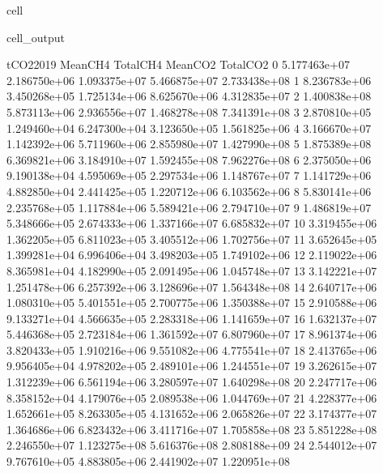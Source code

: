 \documentclass[letterpaper,10pt,english]{jupyterBook}
\begin{document}
\begin{sphinxuseclass}{cell}
\begin{sphinxVerbatimOutput}
\begin{sphinxuseclass}{cell_output}
\begin{sphinxVerbatim}[commandchars=\\\{\}]
       tCO2\PYGZus{}2019      Mean\PYGZus{}CH4     Total\PYGZus{}CH4      Mean\PYGZus{}CO2     Total\PYGZus{}CO2  
0   5.177463e+07  2.186750e+06  1.093375e+07  5.466875e+07  2.733438e+08  
1   8.236783e+06  3.450268e+05  1.725134e+06  8.625670e+06  4.312835e+07  
2   1.400838e+08  5.873113e+06  2.936556e+07  1.468278e+08  7.341391e+08  
3   2.870810e+05  1.249460e+04  6.247300e+04  3.123650e+05  1.561825e+06  
4   3.166670e+07  1.142392e+06  5.711960e+06  2.855980e+07  1.427990e+08  
5   1.875389e+08  6.369821e+06  3.184910e+07  1.592455e+08  7.962276e+08  
6   2.375050e+06  9.190138e+04  4.595069e+05  2.297534e+06  1.148767e+07  
7   1.141729e+06  4.882850e+04  2.441425e+05  1.220712e+06  6.103562e+06  
8   5.830141e+06  2.235768e+05  1.117884e+06  5.589421e+06  2.794710e+07  
9   1.486819e+07  5.348666e+05  2.674333e+06  1.337166e+07  6.685832e+07  
10  3.319455e+06  1.362205e+05  6.811023e+05  3.405512e+06  1.702756e+07  
11  3.652645e+05  1.399281e+04  6.996406e+04  3.498203e+05  1.749102e+06  
12  2.119022e+06  8.365981e+04  4.182990e+05  2.091495e+06  1.045748e+07  
13  3.142221e+07  1.251478e+06  6.257392e+06  3.128696e+07  1.564348e+08  
14  2.640717e+06  1.080310e+05  5.401551e+05  2.700775e+06  1.350388e+07  
15  2.910588e+06  9.133271e+04  4.566635e+05  2.283318e+06  1.141659e+07  
16  1.632137e+07  5.446368e+05  2.723184e+06  1.361592e+07  6.807960e+07  
17  8.961374e+06  3.820433e+05  1.910216e+06  9.551082e+06  4.775541e+07  
18  2.413765e+06  9.956405e+04  4.978202e+05  2.489101e+06  1.244551e+07  
19  3.262615e+07  1.312239e+06  6.561194e+06  3.280597e+07  1.640298e+08  
20  2.247717e+06  8.358152e+04  4.179076e+05  2.089538e+06  1.044769e+07  
21  4.228377e+06  1.652661e+05  8.263305e+05  4.131652e+06  2.065826e+07  
22  3.174377e+07  1.364686e+06  6.823432e+06  3.411716e+07  1.705858e+08  
23  5.851228e+08  2.246550e+07  1.123275e+08  5.616376e+08  2.808188e+09  
24  2.544012e+07  9.767610e+05  4.883805e+06  2.441902e+07  1.220951e+08  
\end{sphinxVerbatim}

\end{sphinxuseclass}\end{sphinxVerbatimOutput}

\end{sphinxuseclass}
\end{document}
